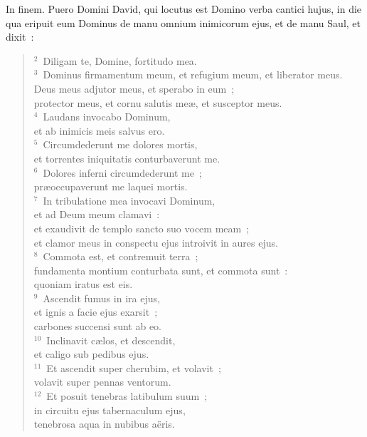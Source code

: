 


\lettrine[lines=3,image=true,loversize=0.05,lraise=-0.03]{I}{}n finem. Puero Domini David, qui locutus est Domino verba cantici hujus, in die qua eripuit eum Dominus de manu omnium inimicorum ejus, et de manu Saul, et dixit~:
\begin{flushleft}\begin{verse}\vspace{6pt}${}^{2}$~Diligam te, Domine, fortitudo mea.\\
${}^{3}$~Dominus firmamentum meum, et refugium meum, et liberator meus.\\ Deus meus adjutor meus, et sperabo in eum~;\\ protector meus, et cornu salutis me\ae , et susceptor meus.\\
${}^{4}$~Laudans invocabo Dominum,\\ et ab inimicis meis salvus ero.\\
${}^{5}$~Circumdederunt me dolores mortis,\\ et torrentes iniquitatis conturbaverunt me.\\
${}^{6}$~Dolores inferni circumdederunt me~;\\ pr\ae occupaverunt me laquei mortis.\\
${}^{7}$~In tribulatione mea invocavi Dominum,\\ et ad Deum meum clamavi~:\\ et exaudivit de templo sancto suo vocem meam~;\\ et clamor meus in conspectu ejus introivit in aures ejus.\\
${}^{8}$~Commota est, et contremuit terra~;\\ fundamenta montium conturbata sunt, et commota sunt~:\\ quoniam iratus est eis.\\
${}^{9}$~Ascendit fumus in ira ejus,\\ et ignis a facie ejus exarsit~;\\ carbones succensi sunt ab eo.\\
${}^{10}$~Inclinavit c\ae los, et descendit,\\ et caligo sub pedibus ejus.\\
${}^{11}$~Et ascendit super cherubim, et volavit~;\\ volavit super pennas ventorum.\\
${}^{12}$~Et posuit tenebras latibulum suum~;\\ in circuitu ejus tabernaculum ejus,\\ tenebrosa aqua in nubibus a\"eris.\\

\end{verse}
\end{flushleft}
